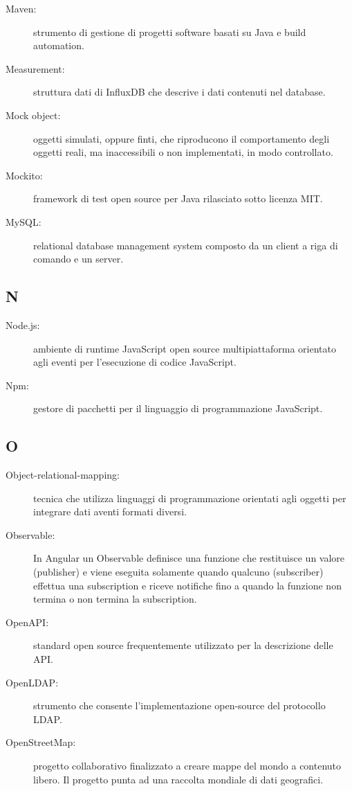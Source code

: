 \documentclass[../manuale-manutentore.tex]{subfiles}
\begin{document}
\begin{description}
    \item[Maven:] strumento di gestione di progetti software basati su Java e build automation.
    \item[Measurement:] struttura dati di InfluxDB che descrive i dati contenuti nel database.
    \item[Mock object:] oggetti simulati, oppure finti, che riproducono il comportamento degli oggetti reali, ma inaccessibili o non implementati, in modo controllato.
    \item[Mockito:] framework di test open source per Java rilasciato sotto licenza MIT\@.
    \item[MySQL:] relational database management system composto da un client a riga di comando e un server.
\end{description}

\subsection{N}

\begin{description}
  \item[Node.js:] ambiente di runtime JavaScript open source multipiattaforma orientato agli eventi per l'esecuzione di codice JavaScript.
  \item[Npm:] gestore di pacchetti per il linguaggio di programmazione JavaScript.
\end{description}

\subsection{O}

\begin{description}
    \item[Object-relational-mapping:] tecnica che utilizza linguaggi di programmazione orientati agli oggetti per integrare dati aventi formati diversi.
    \item[Observable:] In Angular un Observable definisce una funzione che restituisce un valore (publisher) e viene eseguita solamente quando qualcuno (subscriber) effettua una subscription e riceve notifiche fino a quando la funzione non termina o non termina la subscription.
    \item[OpenAPI:] standard open source frequentemente utilizzato per la descrizione delle API\@.
    \item[OpenLDAP:] strumento che consente l'implementazione open-source del protocollo LDAP\@.
    \item[OpenStreetMap:] progetto collaborativo finalizzato a creare mappe del mondo a contenuto libero. Il progetto punta ad una raccolta mondiale di dati geografici.
\end{description}
\end{document}
